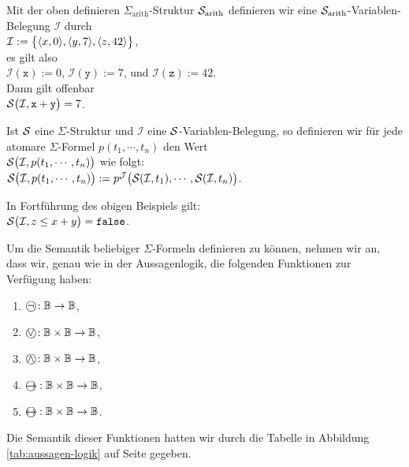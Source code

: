 \example
Mit der oben definieren $\Sigma_\mathrm{arith}$-Struktur
$\mathcal{S}_{\mathrm{arith}}$ definieren wir eine
$\mathcal{S}_{\mathrm{arith}}$-Variablen-Belegung $\mathcal{I}$ durch
\\[0.2cm]
\hspace*{1.3cm} $\mathcal{I} := \bigl\{ \pair(x,0), \pair(y,7), \pair(z,42)\bigr\}$,
\\[0.2cm]
es gilt also
\\[0.2cm]
\hspace*{1.3cm} $\mathcal{I}(\mathtt{x}) := 0$, \quad $\mathcal{I}(\mathtt{y}) := 7$,
\quad und \quad $\mathcal{I}(\mathtt{z}) := 42$.
\\[0.2cm]
Dann gilt offenbar \\[0.2cm]
\hspace*{1.3cm}  $\mathcal{S}\bigl(\mathcal{I}, \mathtt{x} + \mathtt{y} \bigr) = 7$.

\begin{Definition}
    Ist $\mathcal{S}$ eine $\Sigma$-Struktur und $\mathcal{I}$ eine $\mathcal{S}$-Variablen-Belegung,
    so definieren wir f\"{u}r jede atomare $\Sigma$-Formel 
    $p(t_1, \cdots, t_n)$ den Wert \\ $\mathcal{S}\bigl(\mathcal{I}, p(t_1, \cdots, t_n) \bigr)$ wie folgt: \\[0.2cm]
    \hspace*{1.3cm} $\mathcal{S}\bigl(\mathcal{I}, p(t_1,\cdots,t_n)\bigr) := 
                     p^\mathcal{J}\bigl( \mathcal{S}(\mathcal{I}, t_1), \cdots, \mathcal{S}(\mathcal{I}, t_n) \bigr)$.
                     \eox
\end{Definition}

\example
In Fortf\"{u}hrung des obigen Beispiels gilt: \\[0.2cm]
\hspace*{1.3cm}  $\mathcal{S}\bigl(\mathcal{I},z \leq x + y \bigr) = \mathtt{false}$.
\eox

Um die Semantik beliebiger $\Sigma$-Formeln definieren zu k\"{o}nnen, nehmen wir an, dass wir,
genau wie in der Aussagenlogik, die folgenden Funktionen zur Verf\"{u}gung haben:
\begin{enumerate}
\item $\circneg: \mathbb{B} \rightarrow \mathbb{B}$,
\item $\circvee: \mathbb{B} \times \mathbb{B} \rightarrow \mathbb{B}$,
\item $\circwedge: \mathbb{B} \times \mathbb{B} \rightarrow \mathbb{B}$,
\item $\circright: \mathbb{B} \times \mathbb{B} \rightarrow \mathbb{B}$,
\item $\circleftright: \mathbb{B} \times \mathbb{B} \rightarrow \mathbb{B}$.
\end{enumerate}
Die Semantik dieser Funktionen hatten wir durch die Tabelle in Abbildung
\ref{tab:aussagen-logik} auf Seite \pageref{tab:aussagen-logik} gegeben. 

